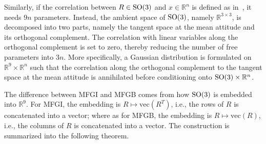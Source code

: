 Similarly, if the correlation between $R\in\mathrm{SO}(3)$ and $x\in\mathbb{R}^n$ is defined as in~\cite{mardia1978model}, it needs $9n$ parameters. 
Instead, the ambient space of $\mathrm{SO}(3)$, namely $\mathbb{R}^{3\times 3}$, is decomposed into two parts, namely the tangent space at the mean attitude and its orthogonal complement.
The correlation with linear variables along the orthogonal complement is set to zero, thereby reducing the number of free parameters into $3n$.
More specifically, a Gaussian distribution is formulated on $\mathbb{R}^9\times\mathbb{R}^n$ such that the correlation along the orthogonal complement to the tangent space at the mean attitude is annihilated before conditioning onto $\mathrm{SO}(3)\times\mathbb{R}^n$.

The difference between MFGI and MFGB comes from how $\mathrm{SO}(3)$ is embedded into $\mathbb{R}^9$.
For MFGI, the embedding is $R\mapsto \mathrm{vec}(R^T)$, i.e., the rows of $R$ is concatenated into a vector;
where as for MFGB, the embedding is $R\mapsto \mathrm{vec}(R)$, i.e., the columns of $R$ is concatenated into a vector.
The construction is summarized into the following theorem.
